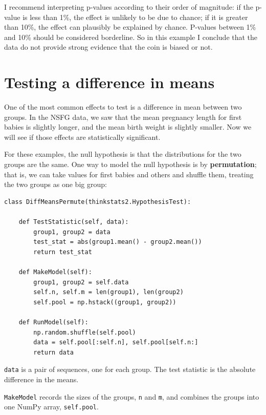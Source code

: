 \documentclass[12pt]{book}
\begin{document}
I recommend interpreting p-values according to their order of
magnitude: if the p-value is less than 1\%, the effect is unlikely to
be due to chance; if it is greater than 10\%, the effect can plausibly
be explained by chance.  P-values between 1\% and 10\% should be
considered borderline.  So in this example I conclude that the
data do not provide strong evidence that the coin is biased or not.


\section{Testing a difference in means}
\label{testdiff}

One of the most common effects to test is a difference in mean
between two groups.  In the NSFG data, we saw that the mean pregnancy
length for first babies is slightly longer, and the mean birth weight
is slightly smaller.  Now we will see if those effects are
statistically significant.

For these examples, the null hypothesis is that the distributions
for the two groups are the same.  One way to model the null
hypothesis is by {\bf permutation}; that is, we can take values
for first babies and others and shuffle them, treating
the two groups as one big group:

\begin{verbatim}
class DiffMeansPermute(thinkstats2.HypothesisTest):

    def TestStatistic(self, data):
        group1, group2 = data
        test_stat = abs(group1.mean() - group2.mean())
        return test_stat

    def MakeModel(self):
        group1, group2 = self.data
        self.n, self.m = len(group1), len(group2)
        self.pool = np.hstack((group1, group2))

    def RunModel(self):
        np.random.shuffle(self.pool)
        data = self.pool[:self.n], self.pool[self.n:]
        return data
\end{verbatim}

{\tt data} is a pair of sequences, one for each
group.  The test statistic is the absolute difference in the means.

{\tt MakeModel} records the sizes of the groups, {\tt n} and
{\tt m}, and combines the groups into one NumPy
array, {\tt self.pool}.
\end{document}
